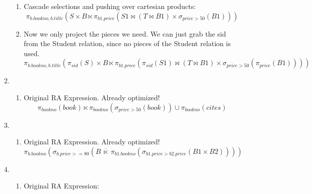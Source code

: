 \documentclass{article}
\begin{document}
\begin{enumerate}
\begin{enumerate}
\begin{enumerate}
        \item Cascade selections and pushing over cartesian products: %
        \begin{displaymath}
            \pi_{b.bookno, b.title}(S \times B \ltimes
            \pi_{b1.price}( S1 \bowtie (T \bowtie B1) \times \sigma_{price>50}(B1)))
        \end{displaymath}

        \item Now we only project the pieces we need. We can just grab the sid from the Student relation, since no pieces
        of the Student relation is used.
        \begin{displaymath}
            \pi_{b.bookno, b.title}(\pi_{sid}(S) \times B \ltimes
            \pi_{b1.price}( \pi_{sid}(S1) \bowtie (T \bowtie B1) \times \sigma_{price>50}(\pi_{price}(B1))))
        \end{displaymath}

    \end{enumerate}

    \item %
    \begin{enumerate}
        \item Original RA Expression. Already optimized! %
        \begin{displaymath}
            \pi_{bookno}(book) \ltimes \pi_{bookno}(\sigma_{price > 50}(book)) \cup \pi_{bookno}(cites)
        \end{displaymath}


    \end{enumerate}

    \item %
    \begin{enumerate}
        \item Original RA Expression. Already optimized! %
        \begin{displaymath}
            \pi_{b.bookno}(\sigma_{b.price >= 80}(B \ \overline{\ltimes}\ \pi_{b1.bookno}(\sigma_{b1.price>b2.price}(B1 \times B2))))
        \end{displaymath}
    \end{enumerate}

    \item %
    \begin{enumerate}
        \item Original RA Expression: %
        \begin{displaymath}
        \end{displaymath}


\end{enumerate}
\end{enumerate}
\end{enumerate}
\end{document}
